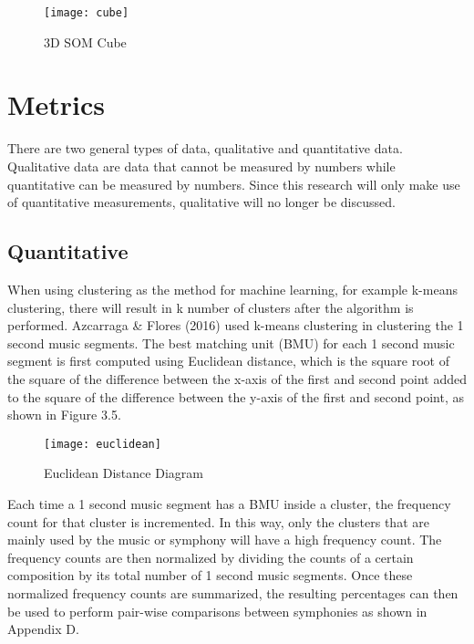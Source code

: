 \begin{figure}[h]
\caption{3D SOM Cube}
\centering
\texttt{[image: cube]}
\end{figure}

\section{Metrics}

There are two general types of data, qualitative and quantitative data. Qualitative data are data that cannot be measured by numbers while quantitative can be measured by numbers. Since this research will only make use of quantitative measurements, qualitative will no longer be discussed.

\subsection{Quantitative}

When using clustering as the method for machine learning, for example k-means clustering, there will result in k number of clusters after the algorithm is performed. Azcarraga \& Flores (2016) used k-means clustering in clustering the 1 second music segments. The best matching unit (BMU) for each 1 second music segment is first computed using Euclidean distance, which is the square root of the square of the difference between the x-axis of the first and second point added to the square of the difference between the y-axis of the first and second point, as shown in Figure 3.5.

\begin{figure}[h]
\caption{Euclidean Distance Diagram}
\centering
\texttt{[image: euclidean]}
\end{figure}

Each time a 1 second music segment has a BMU inside a cluster, the frequency count for that cluster is incremented. In this way, only the clusters that are mainly used by the music or symphony will have a high frequency count. The frequency counts are then normalized by dividing the counts of a certain composition by its total number of 1 second music segments. Once these normalized frequency counts are summarized, the resulting percentages can then be used to perform pair-wise comparisons between symphonies as shown in Appendix D.

\nocite{Dubnov}
\nocite{Azcarraga2016}
\nocite{cambouropoulosEmilios}
\nocite{3dsom}
\nocite{correa}
\nocite{imogen}
\nocite{libin}
\nocite{foote}
\nocite{silla}
\nocite{mcfee}
\nocite{hepokoski}
\nocite{heikkinen}
\nocite{bbc}
\nocite{huron}
\nocite{mckay}
\nocite{mcennis}
\nocite{loughran}
\nocite{lutter}
\nocite{mermelstein}
\nocite{agarwal}
\nocite{iitg}
\nocite{ng}
\nocite{mccria}
\nocite{brownlee}
\nocite{germano}
\nocite{bullinaria}
\nocite{kropotov}
\nocite{grabczewski}
\nocite{gupta}
\nocite{brownlee1}
\nocite{trevino}
\nocite{hartigan}
\nocite{brown}
\nocite{ziv}
\nocite{ron}
\nocite{mitchell}
\nocite{guyon}
\nocite{yang}
\nocite{kohonen}
\nocite{maaten}
\nocite{rumelhart}
\nocite{storkey}